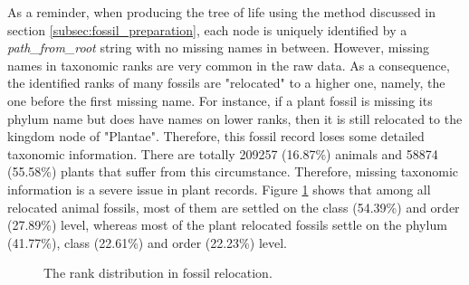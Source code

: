 \documentclass[11pt, a4paper,oneside,chapterprefix=false]{scrbook}
\begin{document}
As a reminder, when producing the tree of life using the method discussed in section \ref{subsec:fossil_preparation}, each node is uniquely identified by a \emph{path\_from\_root} string with no missing names in between. However, missing names in taxonomic ranks are very common in the raw data. As a consequence, the identified ranks of many fossils are "relocated" to a higher one, namely, the one before the first missing name. For instance, if a plant fossil is missing its phylum name but does have names on lower ranks, then it is still relocated to the kingdom node of "Plantae". Therefore, this fossil record loses some detailed taxonomic information. There are totally 209257 (16.87\%) animals and 58874 (55.58\%) plants that suffer from this circumstance. Therefore, missing taxonomic information is a severe issue in plant records. Figure \ref{fig:relocation} shows that among all relocated animal fossils, most of them are settled on the class (54.39\%) and order (27.89\%) level, whereas most of the plant relocated fossils settle on the phylum (41.77\%), class (22.61\%) and order (22.23\%) level. 
\begin{figure}[h]
	\centering
	\hfill
	\caption{The rank distribution in fossil relocation.}
	\label{fig:relocation}
\end{figure}
\end{document}
